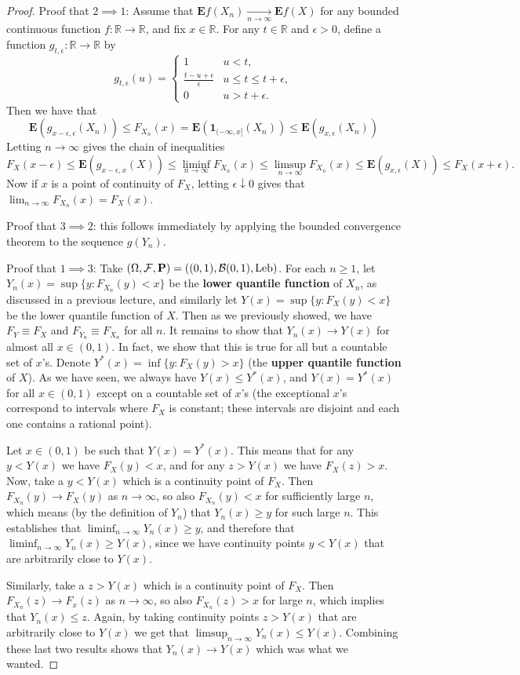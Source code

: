 \documentclass[12pt]{article}
\newcommand{\R}{\mathbb{R}}
\newcommand{\prob}{\mathbf{P}}
\newcommand{\expec}{\mathbf{E}}
\newcommand{\ind}{\textbf{1}}
\theoremstyle{example}
\begin{document}
\begin{proof}
Proof that $2\implies 1$: Assume that $\expec f(X_n) \xrightarrow[n\to\infty]{} \expec f(X)$ for any bounded continuous function $f:\R\to\R$, and fix $x\in \R$. 
For any $t\in \R$ and $\epsilon>0$, define a function
 $g_{t,\epsilon}:\R\to\R$ by
$$ g_{t,\epsilon}(u) = \begin{cases}
1 & u<t, \\
\frac{t-u+\epsilon}{\epsilon} & u \le t \le t+\epsilon, \\
0 & u>t+\epsilon.
\end{cases}
$$
Then we have that
$$ \expec (g_{x-\epsilon,\epsilon}(X_n)) \le F_{X_n}(x) = \expec(\ind_{(-\infty,x]}(X_n)) \le \expec(g_{x,\epsilon}(X_n))$$
Letting $n\to\infty$ gives the chain of inequalities
$$ F_{X}(x-\epsilon) \le \expec(g_{x-\epsilon,x}(X)) \le \liminf_{n\to\infty} F_{X_n}(x) \le \limsup_{n\to\infty} 
F_{X_n}(x) \le \expec(g_{x,\epsilon}(X)) \le F_X(x+\epsilon). $$
Now if $x$ is a point of continuity of $F_X$, letting $\epsilon \downarrow 0$ gives that $\lim_{n\to\infty}F_{X_n}(x) = F_X(x)$.

Proof that $3\implies 2$: this follows immediately by applying the bounded convergence theorem to the sequence $g(Y_n)$.

Proof that $1 \implies 3$: Take $(\Omega,{\cal F},\prob) = ((0,1),{\cal B}(0,1), \textrm{Leb})$. For each $n\ge 1$, let $Y_n(x) = \sup\{ y : F_{X_n}(y) < x \}$ be the \textbf{lower quantile function} of $X_n$, as discussed in a previous lecture, and similarly let $Y(x)=\sup\{ y : F_X(y)<x\}$ be the lower quantile function of $X$. Then as we previously showed, we have $F_Y \equiv F_X$ and $F_{Y_n}\equiv F_{X_n}$ for all $n$. It remains to show that $Y_n(x)\to Y(x)$ for almost all $x\in(0,1)$. In fact, we show that this is true for all but a countable set of $x$'s. Denote $Y^*(x) = \inf\{ y : F_X(y)>x\}$ (the \textbf{upper quantile function} of $X$). As we have seen, we always have $Y(x) \le Y^*(x)$, and $Y(x) = Y^*(x)$ for all $x\in(0,1)$ except on a countable set of $x$'s (the exceptional $x$'s correspond to intervals where $F_X$ is constant; these intervals are disjoint and each one contains a rational point).

Let $x\in(0,1)$ be such that $Y(x)=Y^*(x)$. This means that for any $y<Y(x)$ we have $F_X(y)<x$, and for any $z>Y(x)$ we have $F_X(z)>x$. Now, take a $y<Y(x)$ which is a continuity point of $F_X$. Then $F_{X_n}(y)\to F_X(y)$ as $n\to\infty$, so also $F_{X_n}(y)< x$ for sufficiently large $n$, which means (by the definition of $Y_n$) that $Y_n(x)\ge y$ for such large $n$. This establishes that $\liminf_{n\to\infty} Y_n(x)\ge y$, and therefore that $\liminf_{n\to\infty} Y_n(x)\ge Y(x)$, since we have continuity points $y<Y(x)$ that are arbitrarily close to $Y(x)$.

Similarly, take a $z>Y(x)$ which is a continuity point of $F_X$. Then $F_{X_n}(z)\to F_x(z)$ as $n\to\infty$, so also $F_{X_n}(z)>x$ for large $n$, which implies that $Y_n(x)\le z$. Again, by taking continuity points $z>Y(x)$ that are arbitrarily close to $Y(x)$ we get that $\limsup_{n\to\infty} Y_n(x) \le Y(x)$. Combining these last two results shows that $Y_n(x)\to Y(x)$ which was what we wanted.
\end{proof}
\end{document}
